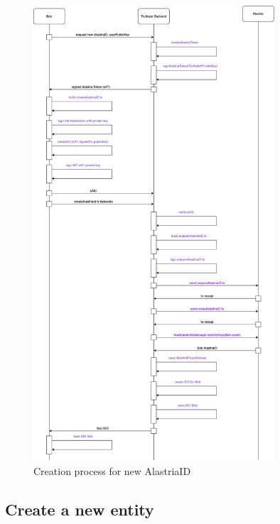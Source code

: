 \documentclass[target=mst,aauheader=]{thud}
\begin{document}
\begin{figure}
    \centering
    \includegraphics[width=0.8\textwidth]{images/createNewAlastriaID.png}
    \caption{Creation process for new AlastriaID}
    \label{fig:addAlastriaID}

\end{figure}

\subsection{Create a new entity}
\end{document}
